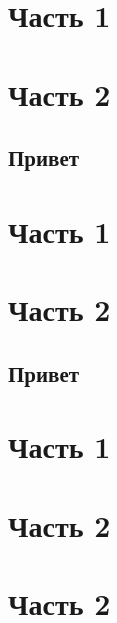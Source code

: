 \documentclass[a4paper,10pt]{article}
\begin{document}
\section{Часть 1}

\section{Часть 2}
\subsection{Привет}
\section{Часть 1}

\section{Часть 2}
\subsection{Привет}
\section{Часть 1}

\section{Часть 2}
\lipsum[6-20]
\lipsum[12-30]

\section{Часть 2}

\label{lastpage}
\end{document}
